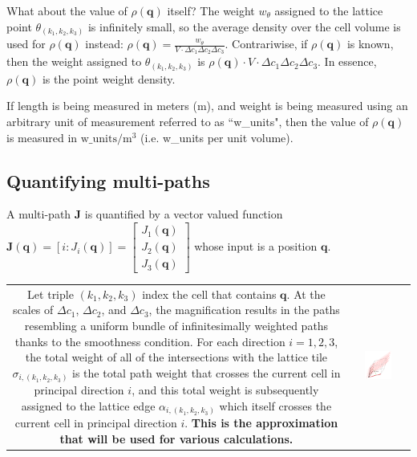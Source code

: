 What about the value of \(\rho(\mathbf{q})\) itself? The weight \(w_\theta\) assigned to the lattice point \(\theta_{(k_1,k_2,k_3)}\) is infinitely small, so the average density over the cell volume is used for \(\rho(\mathbf{q})\) instead: \(\rho(\mathbf{q}) = \frac{w_\theta}{V \cdot \Delta c_1 \Delta c_2 \Delta c_3}\). Contrariwise, if \(\rho(\mathbf{q})\) is known, then the weight assigned to \(\theta_{(k_1,k_2,k_3)}\) is \(\rho(\mathbf{q}) \cdot V \cdot \Delta c_1 \Delta c_2 \Delta c_3\). In essence, \(\rho(\mathbf{q})\) is the point weight density.

If length is being measured in meters (m), and weight is being measured using an arbitrary unit of measurement referred to as ``w\_units", then the value of \(\rho(\mathbf{q})\) is measured in \(\text{w\_units}/\text{m}^3\) (i.e. w\_units per unit volume).




\subsection{Quantifying multi-paths}

A multi-path \(\mathbf{J}\) is quantified by a vector valued function \(\mathbf{J}(\mathbf{q}) = [i : J_i(\mathbf{q})] = \begin{bmatrix} J_1(\mathbf{q}) \\ J_2(\mathbf{q}) \\ J_3(\mathbf{q}) \end{bmatrix}\) whose input is a position \(\mathbf{q}\). 

\begin{tabular}{cc}
\parbox{0.5\textwidth}{
Let triple \((k_1, k_2, k_3)\) index the cell that contains \(\mathbf{q}\). At the scales of \(\Delta c_1\), \(\Delta c_2\), and \(\Delta c_3\), the magnification results in the paths resembling a uniform bundle of infinitesimally weighted paths thanks to the smoothness condition. For each direction \(i = 1, 2, 3\), the total weight of all of the intersections with the lattice tile \(\sigma_{i, (k_1, k_2, k_3)}\) is the total path weight that crosses the current cell in principal direction \(i\), and this total weight is subsequently assigned to the lattice edge \(\alpha_{i, (k_1, k_2, k_3)}\) which itself crosses the current cell in principal direction \(i\). {\bf This is the approximation that will be used for various calculations.} 
} & \parbox{0.5\textwidth}{
\includegraphics[width = 0.5\textwidth]{Coordinate_systems/path_density}
}
\end{tabular}

